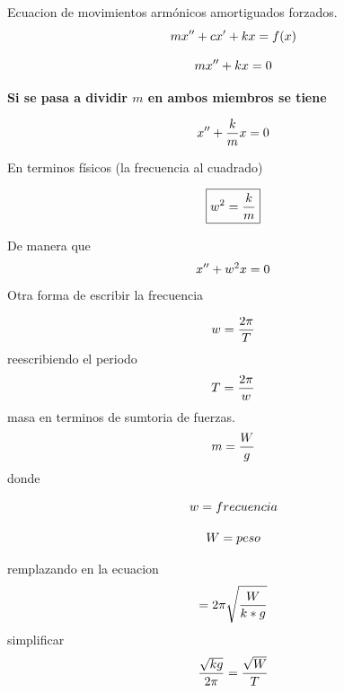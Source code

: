 \documentclass{article}
\begin{document}
Ecuacion de movimientos armónicos amortiguados forzados. 
\begin{equation}
\LARGE mx''+cx'+ kx = f(x)
\end{equation}

\begin{center}
\end{center}



\begin{equation}
\LARGE mx''+kx=0
\end{equation}

\textbf{Si se pasa a dividir \textbf{$m$} en ambos miembros se tiene }

\begin{equation}
\LARGE x''+\frac{k}{m}x=0
\end{equation}

En terminos físicos  (la frecuencia al cuadrado)
\begin{center}
\begin{equation}
$$ \boxed{w^2=\frac{k}{m}}$$
\end{equation}
\end{center}
De manera que
\begin{equation}
\LARGE x''+w^2x=0
\end{equation}
Otra forma de escribir la frecuencia

\begin{equation}
\LARGE w=\frac{2\pi}{T}
\end{equation}
reescribiendo el periodo 
\begin{equation}
\LARGE T=\frac{2\pi}{w}
\end{equation}
masa en terminos de sumtoria de fuerzas.
\begin{equation}
\LARGE m=\frac{W}{g}
\end{equation}
 donde 
 
\begin{equation}
\LARGE w= frecuencia 
\end{equation}

\begin{equation}
\LARGE W= peso
\end{equation}

remplazando en la ecuacion 
\begin{equation}
\LARGE= 2\pi\sqrt{\frac{W}{k*g}}
\end{equation}
simplificar
\begin{equation}
\LARGE\frac{\sqrt{kg}}{2\pi}=\frac{\sqrt{W}}{T}
\end{equation}
\end{document}
